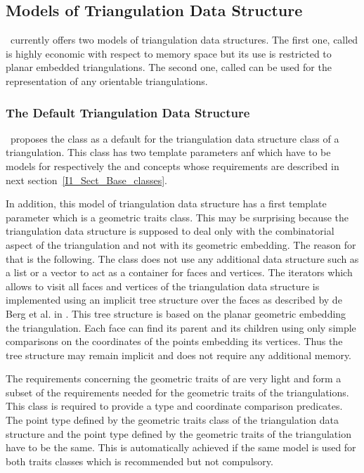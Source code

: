 \subsection{Models of Triangulation Data Structure}
\cgal\ currently offers  two models of triangulation data structures.
The first one, called 
is highly economic with respect to memory space but its use is
restricted
to planar embedded triangulations. The second one, called
 can be used for 
the representation of any  orientable triangulations.

\subsubsection{The Default Triangulation Data Structure}
\cgal\ proposes the class 
as a default for the triangulation data structure class of a triangulation.
This class has two template parameters  anf 
which have 
to be models for respectively the
 and 
 concepts whose requirements are described in next 
section~\ref{I1_Sect_Base_classes}. 

In addition, this model of triangulation data structure has a first template parameter
which is a geometric traits class. This may be surprising because
the triangulation data structure is supposed to deal only with the combinatorial
aspect of the triangulation and not with its geometric embedding.
The reason for that is the following.
The class 
does not use any additional data structure
such as a list or a vector to act as a container for faces and vertices.
The iterators which allows to visit all faces and vertices of the
triangulation
data structure
is implemented using  an implicit tree structure over the faces
as described by
 de Berg et al. in  \cite{bkoo-stses-97}.
 This tree structure is  based on the planar
geometric embedding
the triangulation. Each face 
 can find its parent 
and its children using only simple comparisons on the
coordinates of the points embedding its vertices.
Thus the tree structure may remain implicit 
and does not require any additional memory. 

The requirements concerning the geometric traits  of
 are very light and form a subset of the requirements needed
for the geometric traits of the triangulations. 
This class is required  to provide a type 
and coordinate comparison predicates.
The point type
defined by the geometric traits class of the triangulation data
structure
and the point type defined by the geometric traits of the triangulation
have to be the same.
This is automatically achieved if the same model is used for both
traits classes which is recommended but not compulsory.



